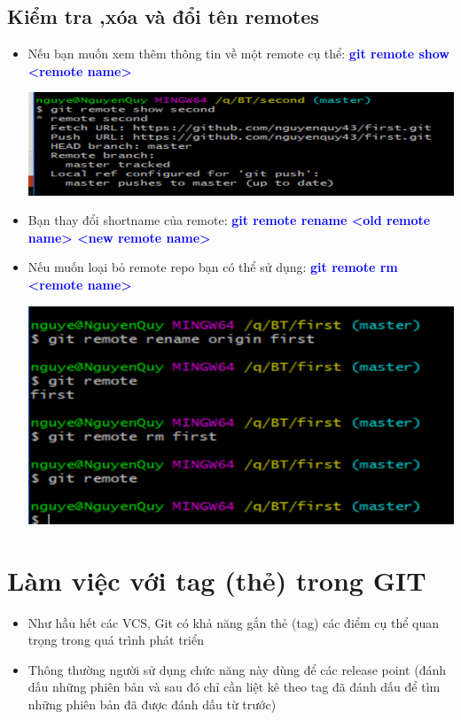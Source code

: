 \documentclass[12pt,a4paper]{report}
\begin{document}
\subsection{Kiểm tra ,xóa và đổi tên remotes} 
\begin{itemize}
\item Nếu bạn muốn xem thêm thông tin về một remote cụ thể: \textcolor{blue}{\bf git remote show <remote name>}

	\includegraphics[width=0.8\linewidth]{screenshot040}

	\label{fig:screenshot040}

\item Bạn thay đổi shortname của remote: \textcolor{blue}{\bf git remote rename <old remote name> <new remote name>}
\item Nếu muốn loại bỏ remote repo  bạn có thể sử dụng: \textcolor{blue}{\bf git remote rm <remote name> }


	\includegraphics[width=0.8\linewidth]{screenshot041}

	\label{fig:screenshot041}
\end{itemize}

			
\section{Làm việc với tag (thẻ) trong GIT}
\begin{itemize}
\item Như hầu hết các VCS, Git có khả năng gắn thẻ (tag) các điểm cụ thể quan trọng trong quá trình phát triển
\item Thông thường người sử dụng chức năng này dùng để các release point (đánh dấu những phiên bản và sau đó chỉ cần liệt kê theo tag đã đánh dấu để tìm những phiên bản đã được đánh dấu từ trước)
\end{itemize}
\end{document}

